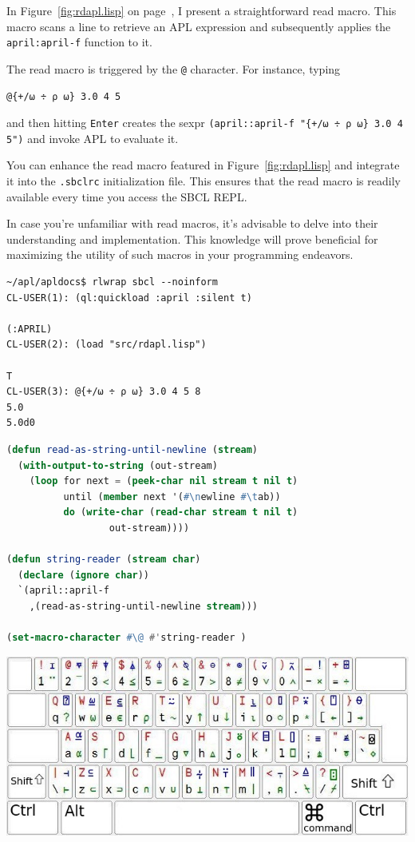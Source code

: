 \documentclass[a4paper,12pt]{book}
\begin{document}
In Figure~\ref{fig:rdapl.lisp}
on page~\pageref{fig:rdapl.lisp}, I present
a straightforward read macro. This macro scans
a line to retrieve an APL expression and subsequently
applies the \verb|april:april-f| function to it.

The read macro is triggered by the \verb|@| character.
For instance, typing
\begin{lstlisting}[language=apl]
  @{+/⍵ ÷ ⍴ ⍵} 3.0 4 5
\end{lstlisting}
and then hitting \verb|Enter| creates the sexpr
{\normalsize\verb|(april::april-f "{+/⍵ ÷ ⍴ ⍵} 3.0 4 5")|}
and invoke APL to evaluate it.

You can enhance the read macro featured
in Figure~\ref{fig:rdapl.lisp} and integrate
it into the \verb|.sbclrc| initialization file.
This ensures that the read macro is readily
available every time you access the SBCL REPL.

In case you're unfamiliar with read macros,
it's advisable to delve into their understanding
and implementation. This knowledge will prove
beneficial for maximizing the utility of such
macros in your programming endeavors.

\begin{lstlisting}[language=apl]
~/apl/apldocs$ rlwrap sbcl --noinform
CL-USER(1): (ql:quickload :april :silent t)

(:APRIL)
CL-USER(2): (load "src/rdapl.lisp")

T
CL-USER(3): @{+/⍵ ÷ ⍴ ⍵} 3.0 4 5 8
5.0
5.0d0
\end{lstlisting}

\begin{lstlisting}[language=lisp,
   caption={File src/rdapl.lisp -- Read Macro for APL},
   label={fig:rdapl.lisp}]
(defun read-as-string-until-newline (stream)
  (with-output-to-string (out-stream)
    (loop for next = (peek-char nil stream t nil t)
          until (member next '(#\newline #\tab))
          do (write-char (read-char stream t nil t)
                  out-stream))))

(defun string-reader (stream char)
  (declare (ignore char))
  `(april::april-f
    ,(read-as-string-until-newline stream)))

(set-macro-character #\@ #'string-reader )
\end{lstlisting}

\noindent
\includegraphics{figs/aplkb-largekeys.jpg}
\end{document}

